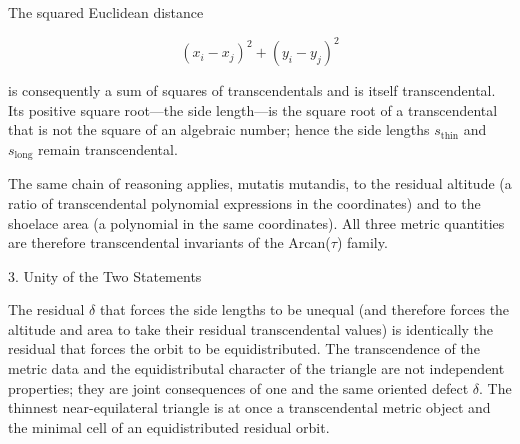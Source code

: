 The squared Euclidean distance

\[
(x_i-x_j)^2+(y_i-y_j)^2
\]

is consequently a sum of squares of transcendentals and is itself transcendental. Its positive square root—the side length—is the square root of a transcendental that is not the square of an algebraic number; hence the side lengths \(s_{\mathrm{thin}}\) and \(s_{\mathrm{long}}\) remain transcendental.

The same chain of reasoning applies, mutatis mutandis, to the residual altitude (a ratio of transcendental polynomial expressions in the coordinates) and to the shoelace area (a polynomial in the same coordinates). All three metric quantities are therefore transcendental invariants of the Arcan(\(\tau\)) family.

3. Unity of the Two Statements

The residual \(\delta\) that forces the side lengths to be unequal (and therefore forces the altitude and area to take their residual transcendental values) is identically the residual that forces the orbit to be equidistributed. The transcendence of the metric data and the equidistributal character of the triangle are not independent properties; they are joint consequences of one and the same oriented defect \(\delta\). The thinnest near-equilateral triangle is at once a transcendental metric object and the minimal cell of an equidistributed residual orbit.
